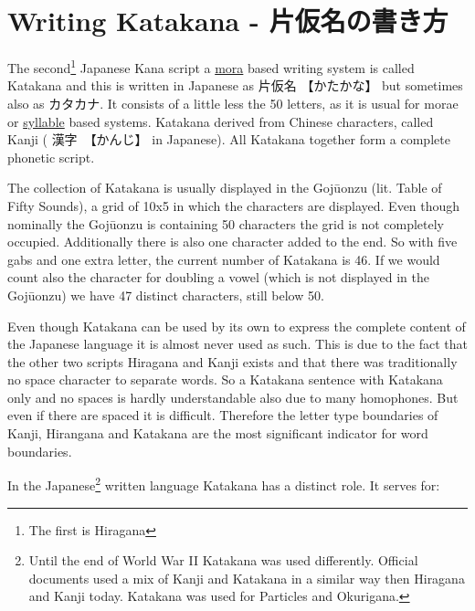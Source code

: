\chapter{Writing Katakana - 片仮名の書き方}

The second\footnote{The first is Hiragana} Japanese Kana script a
\hyperref[sec:Mora]{mora}  based writing system is called Katakana and this is
written in Japanese as {片仮名} {【かたかな】} but sometimes also as
{カタカナ}.  It consists of a little less the 50 letters, as it is usual for
morae or \hyperref[sec:Syllable]{syllable} based systems. Katakana derived from
Chinese characters, called Kanji ( {漢字}　{【かんじ】} in Japanese). All
Katakana together form a complete phonetic script.

The collection of Katakana is usually displayed in the Gojūonzu (lit. Table of
Fifty Sounds), a grid of 10x5 in which the characters are displayed. Even
though nominally the Gojūonzu is containing 50 characters the grid is not
completely occupied. Additionally there is also one character added to the
end. So with five gabs and one extra letter, the current number of Katakana is
46. If we would count also the character for doubling a vowel (which is not
displayed in the Gojūonzu) we have 47 distinct characters, still below 50. 



Even though Katakana can be used by its own to express the complete content of
the Japanese language it is almost never used as such. This is due to the fact
that the other two scripts Hiragana and Kanji exists and that there was
traditionally no space character to separate words. So a Katakana sentence with
Katakana only and no spaces is hardly understandable also due to many
homophones.  But even if there are spaced it is difficult. Therefore the letter
type boundaries of Kanji, Hirangana and Katakana are the most significant
indicator for word boundaries.

In the Japanese\footnote{Until the end of World War II Katakana was used
differently. Official documents used a mix of Kanji and Katakana in a similar
way then Hiragana and Kanji today. Katakana was used for Particles and
Okurigana.} written language Katakana has a distinct role. It serves for:

\bigskip

